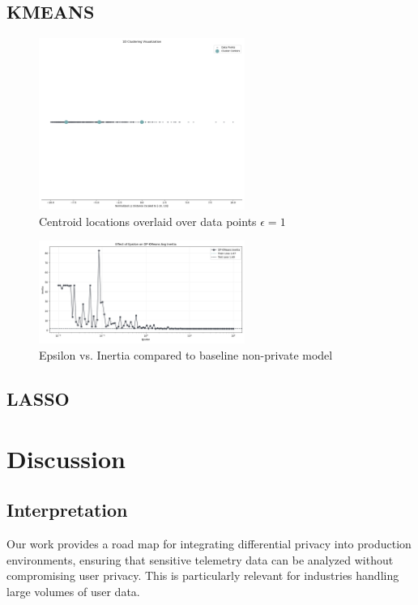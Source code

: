 \documentclass[12pt,letterpaper]{article}
\begin{document}
\subsection{KMEANS}
\begin{figure}[H] %
    \centering
    \includegraphics[width=0.6\textwidth]{figure/1d_clusters.png} %
    \caption{Centroid locations overlaid over data points $\epsilon=1$}
    \label{fig:centroids}
\end{figure}
\begin{figure}[H] %
    \centering
    \includegraphics[width=0.6\textwidth]{figure/dpk_plot.png} %
    \caption{Epsilon vs. Inertia compared to baseline non-private model}
    \label{fig:epsilon_inertia}
\end{figure}
\subsection{LASSO}


\section{Discussion}


\subsection{Interpretation}
Our work provides a road map for integrating differential privacy into production environments, ensuring that sensitive telemetry data can be analyzed without compromising user privacy. This is particularly relevant for industries handling large volumes of user data. 
\end{document}
